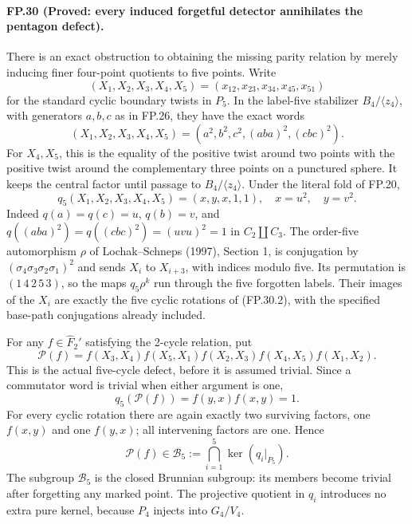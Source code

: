 \paragraph{FP.30 (Proved: every induced forgetful detector annihilates the pentagon defect).}
There is an exact obstruction to obtaining the missing parity relation
by merely inducing finer four-point quotients to five points.
Write
\[
 (X_1,X_2,X_3,X_4,X_5)
   =(x_{12},x_{23},x_{34},x_{45},x_{51})
\]
for the standard cyclic boundary twists in $P_5$. In the label-five
stabilizer $B_4/\langle z_4\rangle$, with generators $a,b,c$ as in
FP.26, they have the exact words
\[
 (X_1,X_2,X_3,X_4,X_5)
       =(a^2,b^2,c^2,(aba)^2,(cbc)^2).
 \tag{FP.30.1}
\]
For $X_4,X_5$, this is the equality of the positive twist around two
points with the positive twist around the complementary three points
on a punctured sphere. It keeps the central factor until passage to
$B_4/\langle z_4\rangle$. Under the literal fold of FP.20,
\[
 q_5(X_1,X_2,X_3,X_4,X_5)=(x,y,x,1,1),
 \quad x=u^2,\quad y=v^2.
 \tag{FP.30.2}
\]
Indeed $q(a)=q(c)=u$, $q(b)=v$, and
$q((aba)^2)=q((cbc)^2)=(uvu)^2=1$ in $C_2\amalg C_3$.
The order-five automorphism $\rho$ of Lochak--Schneps (1997),
Section 1, is conjugation by $(\sigma_4\sigma_3\sigma_2\sigma_1)^2$
and sends $X_i$ to $X_{i+3}$, with indices modulo five.
Its permutation is $(1\,4\,2\,5\,3)$, so the maps
$q_5\rho^k$ run through the five forgotten labels. Their images of
the $X_i$ are exactly the five cyclic rotations of (FP.30.2), with
the specified base-path conjugations already included.

For any $f\in\widehat F_2'$ satisfying the 2-cycle relation, put
\[
 \mathcal P(f)=f(X_3,X_4)f(X_5,X_1)f(X_2,X_3)
                         f(X_4,X_5)f(X_1,X_2).
 \tag{FP.30.3}
\]
This is the actual five-cycle defect, before it is assumed trivial.
Since a commutator word is trivial when either argument is one,
\[
 q_5(\mathcal P(f))=f(y,x)f(x,y)=1.
\]
For every cyclic rotation there are again exactly two surviving
factors, one $f(x,y)$ and one $f(y,x)$; all intervening factors are
one. Hence
\[
 \mathcal P(f)\in\mathcal B_5:=
                \bigcap_{i=1}^{5}\ker(q_i|_{P_5}).
 \tag{FP.30.4}
\]
The subgroup $\mathcal B_5$ is the closed Brunnian subgroup: its
members become trivial after forgetting any marked point. The
projective quotient in $q_i$ introduces no extra pure kernel, because
$P_4$ injects into $G_4/V_4$.

